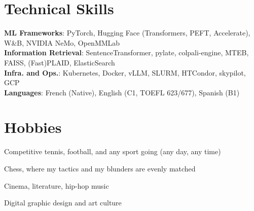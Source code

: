 \documentclass[a4paper,11pt]{article}
\begin{document}
\begin{minipage}[t]{0.66\textwidth}
\section{\textbf{Technical Skills}}
\begin{itemize}[leftmargin=0in, label={}]
 \small{\item{
\textbf{ML Frameworks}{: PyTorch, Hugging Face (Transformers, PEFT, Accelerate),  W\&B, NVIDIA NeMo, OpenMMLab} \\
\textbf{Information Retrieval}{: SentenceTransformer, pylate, colpali-engine, MTEB, FAISS, (Fast)PLAID}, ElasticSearch \\
\textbf{Infra. and Ops.}{: Kubernetes, Docker, vLLM, SLURM, HTCondor, skypilot, GCP} \\
\textbf{Languages}{: French (Native), English (C1, TOEFL 623/677), Spanish (B1)} \\
}}
\end{itemize}
\end{minipage}
\hfill
\begin{minipage}[t]{0.32\textwidth}
\section{\textbf{Hobbies}}
  \begin{itemize}[leftmargin=10pt, noitemsep, topsep=0pt, partopsep=0pt, parsep=0pt]
    \small{
    \item {Competitive tennis, football, and any sport going (any day, any time)}
    \item {Chess, where my tactics and my blunders are evenly matched}
    \item {Cinema, literature, hip-hop music}
    \item {Digital graphic design and art culture}
  }
    \end{itemize}
\end{minipage}



\end{document}
